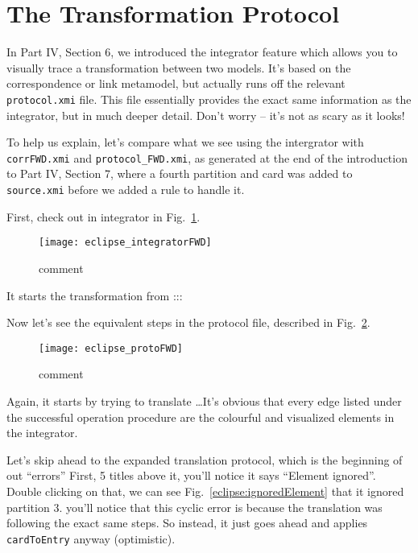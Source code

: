 \newpage

\section{The Transformation Protocol}

\genHeader

In Part IV, Section 6, we introduced the integrator feature which allows you to visually trace a transformation between two models. It's based on the
correspondence or link metamodel, but actually runs off the relevant \texttt{protocol.xmi} file. This file essentially provides the exact same information as
the integrator, but in much deeper detail. Don't worry -- it's not as scary as it looks!

To help us explain, let's compare what we see using the intergrator with \texttt{corrFWD.xmi} and \texttt{protocol\_FWD.xmi}, as generated at the end of the
introduction to Part IV, Section 7, where a fourth partition and card was added to \texttt{source.xmi} before we added a rule to handle it.

First, check out in integrator in Fig.~\ref{eclipse:integratorFWD}.

\begin{figure}[htbp]
\begin{center} 
  \texttt{[image: eclipse\_integratorFWD]}
  \caption{comment}  
  \label{eclipse:integratorFWD}
\end{center}
\end{figure}

It starts the transformation from :::

Now let's see the equivalent steps in the protocol file, described in Fig.~\ref{eclipse:protocolFWD}.

\begin{figure}[htbp]
\begin{center} 
  \texttt{[image: eclipse\_protoFWD]}
  \caption{comment}  
  \label{eclipse:protocolFWD}
\end{center}
\end{figure}

Again, it starts by trying to translate \ldots It's obvious that every edge listed under the successful operation procedure are the colourful and visualized
elements in the integrator.

Let's skip ahead to the expanded translation protocol, which is the beginning of out ``errors'' First, 5 titles above it, you'll notice it says ``Element
ignored''. Double clicking on that, we can see Fig.~\ref{eclipse:ignoredElement} that it ignored partition 3. you'll notice that this cyclic error is because
the translation was following the exact same steps. So instead, it just goes ahead and applies \texttt{cardToEntry} anyway (optimistic).

